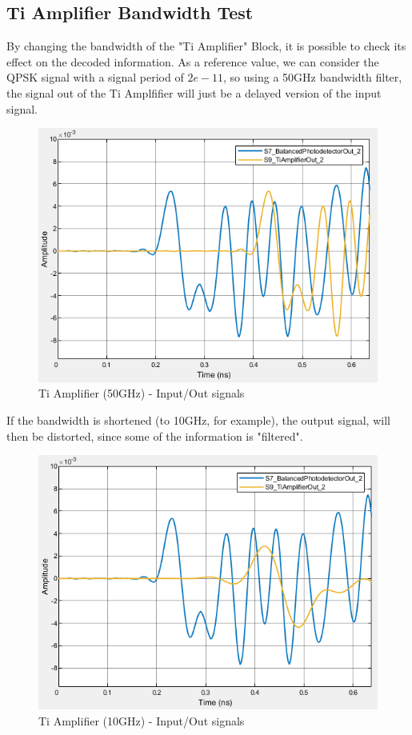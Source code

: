 \subsection*{Ti Amplifier Bandwidth Test}
By changing the bandwidth of the "Ti Amplifier" Block, it is possible to check its effect on the decoded information.
As a reference value, we can consider the QPSK signal with a signal period of $2e-11$, so using a 50GHz bandwidth filter, the signal out of the Ti Amplfifier will just be a delayed version of the input signal.
\begin{figure}[H]
	\centering
	\includegraphics[scale=0.75]{./lib/m_qam_receiver/figures/tiamp1}
	\caption{Ti Amplifier (50GHz) - Input/Out signals}\label{tiamp1}
\end{figure}
If the bandwidth is shortened (to 10GHz, for example), the output signal, will then be distorted, since some of the information is "filtered".
 \begin{figure}[H]
	\centering
	\includegraphics[scale=0.75]{./lib/m_qam_receiver/figures/tiamp2}
	\caption{Ti Amplifier (10GHz) - Input/Out signals}\label{tiamp2}
\end{figure}

